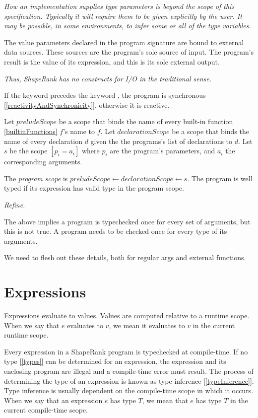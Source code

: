 \documentclass{article}
\begin{document}
{\em
How an implementation supplies type parameters is beyond the scope of this specification. Typically it will require them to be given explicitly by the user.
It may be possible, in some environments, to infer some or all of the type variables.
}

The value parameters declared in the program signature are bound to external data sources. These sources are the program's sole source of input. The program's result is the value of its expression, and this is its sole external output. 

{\em 
Thus, ShapeRank has no constructs for I/O in the traditional sense.
}

If the keyword \SYNC precedes the keyword \PROGRAM, the program is synchronous [\ref{reactivityAndSynchronicity}], otherwise it is reactive.

Let $preludeScope$ be a scope that binds the name of every built-in function \ref{builtinFunctions} $f$'s name to $f$.
Let $declarationScope$ be a scope that binds the name of every declaration $d$ given the the programs's list of declarations to $d$.
Let $s$ be the scope $[p_i = a_i]$  where $p_i$ are the program's parameters, and $a_i$ the corresponding arguments.

The {\em program scope} is $preludeScope \leftarrow declarationScope \leftarrow s$.  
The program is well typed if its expression has valid type in the program scope.

{\em Refine.

The above implies a program is typechecked once for every set of  arguments, but this is not true.  A program needs to be checked once for every type of its arguments. 

We need to flesh out these details, both for regular args and external functions.

}

\section{Expressions}
\label{expressions}

Expressions evaluate to values. Values are computed relative to a runtime scope. When we say that $e$ evaluates to $v$, we mean it evaluates to $v$ in the current runtime scope.

\Expression{} 

Every expression in a ShapeRank program is typechecked at compile-time. If no type [\ref{types}] can be determined for an expression, the expression and its enclosing program are illegal and a compile-time error must result. The process of determining the type of an expression is known as type inference [\ref{typeInference}]. Type inference  is usually dependent on the compile-time scope in which it occurs. When we say that an expression $e$ has type $T$, we mean that $e$ has type $T$ in the current compile-time scope.
\end{document}
